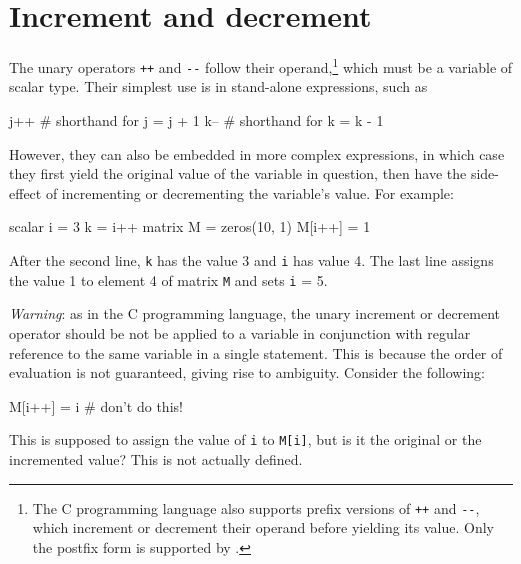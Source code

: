 \section{Increment and decrement}

The unary operators \texttt{++} and \verb|--| follow their
operand,\footnote{The C programming language also supports prefix
  versions of \texttt{++} and \verb|--|, which increment or decrement
  their operand before yielding its value. Only the postfix form is
  supported by .}  which must be a variable of scalar
type. Their simplest use is in stand-alone expressions, such as
%
\begin{code}
j++  # shorthand for j = j + 1
k--  # shorthand for k = k - 1
\end{code}
%
However, they can also be embedded in more complex expressions, in
which case they first yield the original value of the variable in
question, then have the side-effect of incrementing or decrementing
the variable's value. For example:
%
\begin{code}
scalar i = 3
k = i++
matrix M = zeros(10, 1)
M[i++] = 1
\end{code}
%
After the second line, \texttt{k} has the value 3 and \texttt{i} has
value 4. The last line assigns the value 1 to element 4 of
matrix \texttt{M} and sets \texttt{i} = 5.

\textit{Warning}: as in the C programming language, the unary
increment or decrement operator should be not be applied to a
variable in conjunction with regular reference to the same variable in
a single statement. This is because the order of evaluation is not
guaranteed, giving rise to ambiguity. Consider the following:
%
\begin{code}
M[i++] = i # don't do this!
\end{code}
%
This is supposed to assign the value of \texttt{i} to \texttt{M[i]},
but is it the original or the incremented value? This is not actually
defined. 










